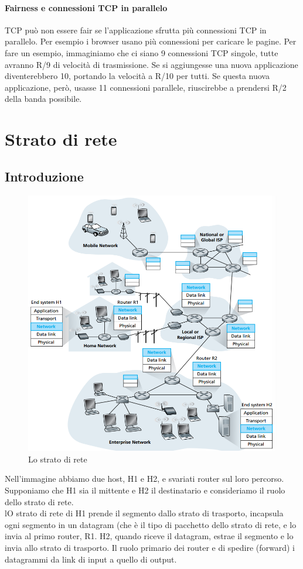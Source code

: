 \documentclass[11pt,a4paper]{article}
\begin{document}
\paragraph{Fairness e connessioni TCP in parallelo}
TCP può non essere fair se l'applicazione sfrutta più connessioni TCP in parallelo. Per esempio i browser usano più connessioni per caricare le pagine. Per fare un esempio, immaginiamo che ci siano 9 connessioni TCP singole, tutte avranno R/9 di velocità di trasmissione. Se si aggiungesse una nuova applicazione diventerebbero 10, portando la velocità a R/10 per tutti. Se questa nuova applicazione, però, usasse 11 connessioni parallele, riuscirebbe a prendersi R/2 della banda possibile.

\section{Strato di rete}
\subsection{Introduzione}
\begin{figure}
	\includegraphics[scale=0.6]{img/049.png}
	\caption{Lo strato di rete}
\end{figure}
Nell'immagine abbiamo due host, H1 e H2, e svariati router sul loro percorso. Supponiamo che H1 sia il mittente e H2 il destinatario e consideriamo il ruolo dello strato di rete. \\
lO strato di rete di H1 prende il segmento dallo strato di trasporto, incapsula ogni segmento in un datagram (che è il tipo di pacchetto dello strato di rete, e lo invia al primo router, R1. H2, quando riceve il datagram, estrae il segmento e lo invia allo strato di trasporto. Il ruolo primario dei router e di spedire (forward) i datagrammi da link di input a quello di output.
\end{document}
